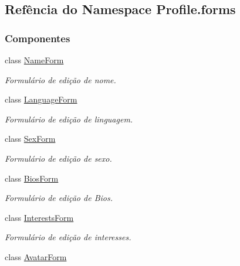 \hypertarget{namespaceProfile_1_1forms}{\subsection{Refência do Namespace Profile.\-forms}
\label{namespaceProfile_1_1forms}
}
\subsubsection*{Componentes}
\begin{DoxyCompactItemize}
\item 
class \hyperlink{classProfile_1_1forms_1_1NameForm}{Name\-Form}
\begin{DoxyCompactList}\small\item\em Formulário de edição de nome. \end{DoxyCompactList}\item 
class \hyperlink{classProfile_1_1forms_1_1LanguageForm}{Language\-Form}
\begin{DoxyCompactList}\small\item\em Formulário de edição de linguagem. \end{DoxyCompactList}\item 
class \hyperlink{classProfile_1_1forms_1_1SexForm}{Sex\-Form}
\begin{DoxyCompactList}\small\item\em Formulário de edição de sexo. \end{DoxyCompactList}\item 
class \hyperlink{classProfile_1_1forms_1_1BiosForm}{Bios\-Form}
\begin{DoxyCompactList}\small\item\em Formulário de edição de Bios. \end{DoxyCompactList}\item 
class \hyperlink{classProfile_1_1forms_1_1InterestsForm}{Interests\-Form}
\begin{DoxyCompactList}\small\item\em Formulário de edição de interesses. \end{DoxyCompactList}\item 
class \hyperlink{classProfile_1_1forms_1_1AvatarForm}{Avatar\-Form}
\end{DoxyCompactItemize}
